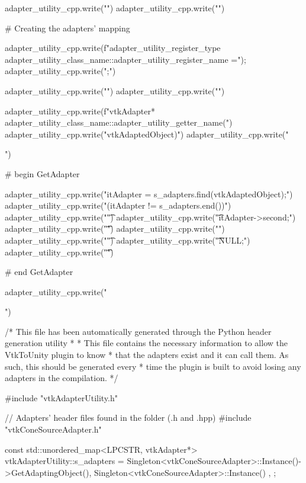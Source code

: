 \begin{appendices}
\begin{python}[label=lst:generateheader,caption={generate-header.py script},aboveskip=20pt]
adapter_utility_cpp.write("\n")
adapter_utility_cpp.write("\n")

# Creating the adapters' mapping

adapter_utility_cpp.write(f"{adapter_utility_register_type} {adapter_utility_class_name}::{adapter_utility_register_name} =");
adapter_utility_cpp.write(";\n")

adapter_utility_cpp.write("\n")
adapter_utility_cpp.write("\n")

adapter_utility_cpp.write(f"vtkAdapter* {adapter_utility_class_name}::{adapter_utility_getter_name}(\n")
adapter_utility_cpp.write("\tLPCSTR vtkAdaptedObject)\n")
adapter_utility_cpp.write("{\n")

# begin GetAdapter

adapter_utility_cpp.write("\tauto itAdapter = s_adapters.find(vtkAdaptedObject);\n")
adapter_utility_cpp.write("\tif (itAdapter != s_adapters.end())\n")
adapter_utility_cpp.write("\t{\n")
adapter_utility_cpp.write("\t\treturn itAdapter->second;\n")
adapter_utility_cpp.write("\t}\n")
adapter_utility_cpp.write("\telse\n")
adapter_utility_cpp.write("\t{\n")
adapter_utility_cpp.write("\t\treturn NULL;\n")
adapter_utility_cpp.write("\t}\n")

# end GetAdapter

adapter_utility_cpp.write("}\n")
\end{python}
    
\begin{cpp}[label=lst:vtkAdapterutilityex,caption={Example vtkAdapterUtility.cpp},aboveskip=20pt]
/* This file has been automatically generated through the Python header generation utility
 * 
 * This file contains the necessary information to allow the VtkToUnity plugin to know
 * that the adapters exist and it can call them. As such, this should be generated every
 * time the plugin is built to avoid losing any adapters in the compilation.
 */


#include "vtkAdapterUtility.h"

// Adapters' header files found in the folder (.h and .hpp)
#include "vtkConeSourceAdapter.h"


const std::unordered_map<LPCSTR, vtkAdapter*> vtkAdapterUtility::s_adapters ={
	{ Singleton<vtkConeSourceAdapter>::Instance()->GetAdaptingObject(), Singleton<vtkConeSourceAdapter>::Instance() },
};



\end{cpp}
\end{appendices}
